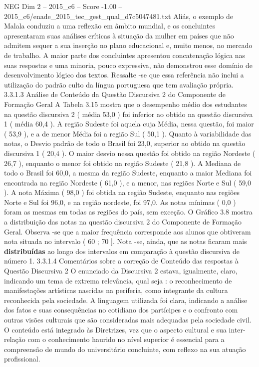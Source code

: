 \begin{textsample}{NEG Dim 2 – 2015\_c6 – Score -1.00 – 2015\_c6/enade\_2015\_tec\_gest\_qual\_d7c5047481.txt}
Aliás, o exemplo de Malala conduziu a uma reflexão em âmbito mundial, e os concluintes apresentaram suas análises críticas à situação da mulher em países que não admitem sequer a sua inserção no plano educacional e, muito menos, no mercado de trabalho.
A maior parte dos concluintes apresentou concatenação lógica nas suas respostas e uma minoria, pouco expressiva, não demonstrou esse domínio de desenvolvimento lógico dos textos.
Ressalte -se que essa referência não inclui a utilização do padrão culto da língua portuguesa que tem avaliação própria. 3.3.1.3 Análise de Conteúdo da Questão Discursiva 2 do Componente de Formação Geral A Tabela 3.15 mostra que o desempenho médio dos estudantes na questão discursiva 2 ( média 53,0 ) foi inferior ao obtido na questão discursiva 1 ( média 60,4 ).
A região Sudeste foi aquela cuja Média, nessa questão, foi maior ( 53,9 ), e a de menor Média foi a região Sul ( 50,1 ).
Quanto à variabilidade das notas, o Desvio padrão de todo o Brasil foi 23,0, superior ao obtido na questão discursiva 1 ( 20,4 ).
O maior desvio nessa questão foi obtido na região Nordeste ( 26,7 ), enquanto o menor foi obtido na região Sudeste ( 21,8 ).
A Mediana de todo o Brasil foi 60,0, a mesma da região Sudeste, enquanto a maior Mediana foi encontrada na região Nordeste ( 61,0 ), e a menor, nas regiões Norte e Sul ( 59,0 ).
A nota Máxima ( 98,0 ) foi obtida na região Sudeste, enquanto nas regiões Norte e Sul foi 96,0, e na região nordeste, foi 97,0.
As notas mínimas ( 0,0 ) foram as mesmas em todas as regiões do país, sem exceção.
O Gráfico 3.8 mostra a distribuição das notas na questão discursiva 2 do Componente de Formação Geral.
Observa -se que a maior frequência corresponde aos alunos que obtiveram nota situada no intervalo ( 60 ; 70 ].
Nota -se, ainda, que as notas ficaram mais \textbf{distribuídas} ao longo dos intervalos em comparação à questão discursiva de número 1. 3.3.1.4 Comentários sobre a correção de Conteúdo das respostas à Questão Discursiva 2 O enunciado da Discursiva 2 estava, igualmente, claro, indicando um tema de extrema relevância, qual seja : o reconhecimento de manifestações artísticas nascidas na periferia, como integrante da cultura reconhecida pela sociedade.
A linguagem utilizada foi clara, indicando a análise dos fatos e suas consequências no cotidiano dos partícipes e o confronto com outras visões culturais que são consideradas mais adequadas pela sociedade civil.
O conteúdo está integrado às Diretrizes, vez que o aspecto cultural e sua inter-relação com o conhecimento haurido no nível superior é essencial para a compreensão de mundo do universitário concluinte, com reflexo na sua atuação profissional.

\end{textsample}
